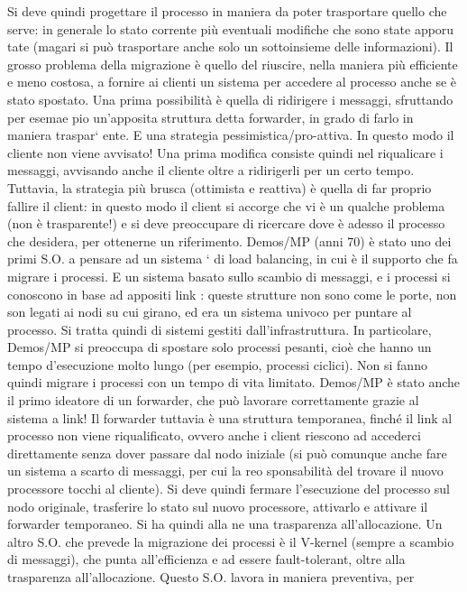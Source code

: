Si deve quindi progettare il processo in maniera da poter trasportare quello che
serve: in generale lo stato corrente più eventuali modifiche che sono state apporu
tate (magari si può trasportare anche solo un sottoinsieme delle informazioni).
Il grosso problema della migrazione è quello del riuscire, nella maniera più
efficiente e meno costosa, a fornire ai clienti un sistema per accedere al processo
anche se è stato spostato.
Una prima possibilità è quella di ridirigere i messaggi, sfruttando per esemae
pio un'apposita struttura detta forwarder, in grado di farlo in maniera traspar`
ente. E una strategia pessimistica/pro-attiva. In questo modo il cliente non
viene avvisato! Una prima modifica consiste quindi nel riqualicare i messaggi,
avvisando anche il cliente oltre a ridirigerli per un certo tempo.
Tuttavia, la strategia più brusca (ottimista e reattiva) è quella di far proprio
fallire il client: in questo modo il client si accorge che vi è un qualche problema
(non è trasparente!) e si deve preoccupare di ricercare dove è adesso il processo
che desidera, per ottenerne un riferimento.
Demos/MP (anni 70) è stato uno dei primi S.O. a pensare ad un sistema
`
di load balancing, in cui è il supporto che fa migrare i processi. E un sistema
basato sullo scambio di messaggi, e i processi si conoscono in base ad appositi
link : queste strutture non sono come le porte, non son legati ai nodi su cui
girano, ed era un sistema univoco per puntare al processo. Si tratta quindi di
sistemi gestiti dall'infrastruttura.
In particolare, Demos/MP si preoccupa di spostare solo processi pesanti, cioè
che hanno un tempo d'esecuzione molto lungo (per esempio, processi ciclici).
Non si fanno quindi migrare i processi con un tempo di vita limitato.
Demos/MP è stato anche il primo ideatore di un forwarder, che può lavorare
correttamente grazie al sistema a link! Il forwarder tuttavia è una struttura
temporanea, finché il link al processo non viene riqualificato, ovvero anche i
client riescono ad accederci direttamente senza dover passare dal nodo iniziale
(si può comunque anche fare un sistema a scarto di messaggi, per cui la reo
sponsabilità del trovare il nuovo processore tocchi al cliente). Si deve quindi
fermare l'esecuzione del processo sul nodo originale, trasferire lo stato sul nuovo
processore, attivarlo e attivare il forwarder temporaneo. Si ha quindi alla ne
una trasparenza all'allocazione.
Un altro S.O. che prevede la migrazione dei processi è il V-kernel (sempre
a scambio di messaggi), che punta all'efficienza e ad essere fault-tolerant, oltre
alla trasparenza all'allocazione. Questo S.O. lavora in maniera preventiva, per
